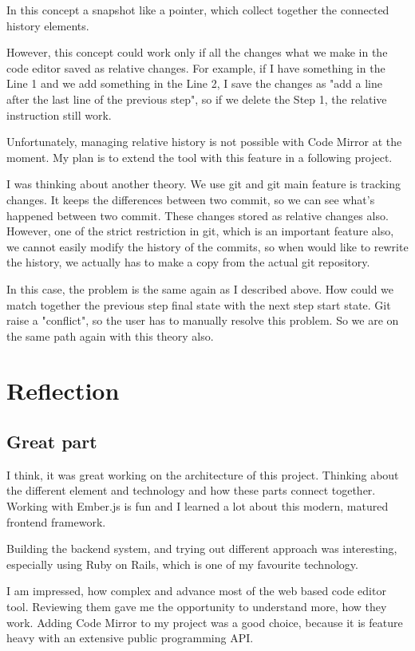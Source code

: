 \documentclass[12pt, a4paper, oneside, openright, medskipamount]{report}
\begin{document}
In this concept a snapshot like a pointer, which collect together the connected history elements.

However, this concept could work only if all the changes what we make in the code editor saved as relative changes. For example, if I have something in the Line 1 and we add something in the Line 2, I save the changes as "add a line after the last line of the previous step", so if we delete the Step 1, the relative instruction still work.

Unfortunately, managing relative history is not possible with Code Mirror at the moment. My plan is to extend the tool with this feature in a following project.

I was thinking about another theory. We use git and git main feature is tracking changes. It keeps the differences between two commit, so we can see what's happened between two commit. These changes stored as relative changes also. However, one of the strict restriction in git, which is an important feature also, we cannot easily modify the history of the commits, so when would like to rewrite the history, we actually has to make a copy from the actual git repository.

In this case, the problem is the same again as I described above. How could we match together the previous step final state with the next step start state. Git raise a "conflict", so the user has to manually resolve this problem. So we are on the same path again with this theory also.

\section{Reflection}

\subsection{Great part}

I think, it was great working on the architecture of this project. Thinking about the different element and technology and how these parts connect together. Working with Ember.js is fun and I learned a lot about this modern, matured frontend framework.

Building the backend system, and trying out different approach was interesting, especially using Ruby on Rails, which is one of my favourite technology.

I am impressed, how complex and advance most of the web based code editor tool. Reviewing them gave me the opportunity to understand more, how they work. Adding Code Mirror to my project was a good choice, because it is feature heavy with an extensive public programming API.
\end{document}
